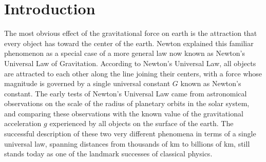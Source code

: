 \documentclass{revtex4}
\begin{document}
%
%
%
%

\section{Introduction}

The most obvious effect of the gravitational force on earth is the
attraction that every object has toward the center of the earth.  Newton
explained this familiar phenomenon as a special case of a more general
law now known as Newton's Universal Law of Gravitation.   According
to Newton's Universal Law, all objects are attracted to each other along
the line joining their centers, with a force whose magnitude is governed
by a single universal constant $G$ known as Newton's constant.  The
early tests of Newton's Universal Law came from astronomical observations
on the scale of the radius of planetary orbits in the solar system, and
comparing these observations with the known value of the gravitational
acceleration $g$ experienced by all objects on the surface of the earth.
The successful description of these two very different phenomena in terms
of a single universal law, spanning distances from thousands of km to
billions of km, still stands today as one of the landmark successes of
classical physics.
\end{document}
